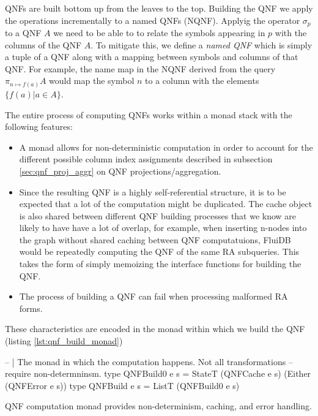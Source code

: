 QNFs are built bottom up from the leaves to the top.  Building the QNF
we apply the operations incrementally to a named QNFs (NQNF).  Applyig
the operator \(\sigma_p\) to a QNF \(A\) we need to be able to to
relate the symbols appearing in \(p\) with the columns of the QNF
\(A\). To mitigate this, we define a \emph{named QNF} which is simply a
tuple of a QNF along with a mapping between symbols and columns of
that QNF.  For example, the name map in the NQNF derived from the
query \(\pi_{n \mapsto f(a)} A\) would map the symbol \(n\) to a
column with the elements \(\{f(a) | a \in A\}\).

The entire process of computing QNFs works within a monad stack with
the following features:

\begin{itemize}
\item A  monad allows for non-deterministic computation in
  order to account for the different possible column index assignments
  described in subsection \ref{sec:qnf_proj_aggr} on QNF
  projections/aggregation.
\item Since the resulting QNF is a highly self-referential structure,
  it is to be expected that a lot of the computation might be
  duplicated. The cache object is also shared between different QNF
  building processes that we know are likely to have have a lot of
  overlap, for example, when inserting n-nodes into the graph without
  shared caching between QNF computatuions, FluiDB would be repeatedly computing the QNF of the
  same RA subqueries. This takes the form of simply memoizing the
  interface functions for building the QNF.
\item The process of building a QNF can fail when processing malformed
  RA forms.
\end{itemize}

These characteristics are encoded in the monad within which we build
the QNF (listing \ref{lst:qnf_build_monad})

\begin{code}
  \begin{haskellcode}
    -- | The monad in which the computation happens. Not all transformations
    -- require non-determninsm.
    type QNFBuild0 e s = StateT (QNFCache e s) (Either (QNFError e s))
    type QNFBuild e s = ListT (QNFBuild0 e s)
  \end{haskellcode}
  \caption{\label{lst:qnf_build_monad}QNF computation monad provides
    non-determinism, caching, and error handling.}
\end{code}

